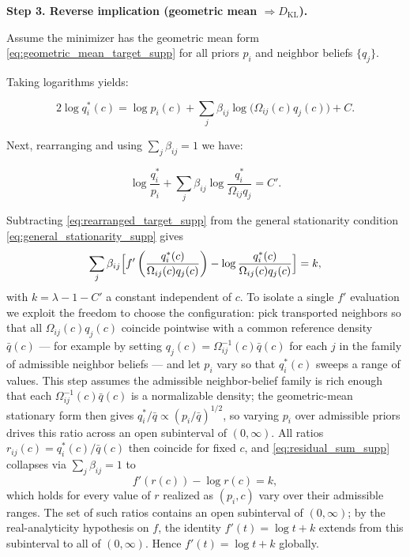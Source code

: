 \documentclass[twoside,11pt]{article}
\begin{document}
\textbf{Step 3. Reverse implication (geometric mean $\Rightarrow D_{\mathrm{KL}}$).}

Assume the minimizer has the geometric mean form \eqref{eq:geometric_mean_target_supp} for all priors $p_i$ and neighbor beliefs $\{q_j\}$.

Taking logarithms yields:

\begin{equation}
2\log q_i^*(c) = \log p_i(c) + \sum_j\beta_{ij}\log\bigl(\Omega_{ij}(c) q_j(c)\bigr) + C.
\label{eq:log_target_supp}
\end{equation}

Next, rearranging and using $\sum_j\beta_{ij}=1$ we have:

\begin{equation}
\log\frac{q_i^*}{p_i} + \sum_j\beta_{ij}\log\frac{q_i^*}{\Omega_{ij}q_j} = C'.
\label{eq:rearranged_target_supp}
\end{equation}

Subtracting \eqref{eq:rearranged_target_supp} from the general stationarity condition \eqref{eq:general_stationarity_supp} gives
\begin{equation}
\sum_{j} \beta_{ij}\Bigl[ f'\left(\frac{q_i^*(c)}{\Omega_{ij}(c)q_j(c)}\right) - \log\frac{q_i^*(c)}{\Omega_{ij}(c)q_j(c)}\Bigr] = k,
\label{eq:residual_sum_supp}
\end{equation}
with $k = \lambda - 1 - C'$ a constant independent of $c$. To isolate a single $f'$ evaluation we exploit the freedom to choose the configuration: pick transported neighbors so that all $\Omega_{ij}(c) q_j(c)$ coincide pointwise with a common reference density $\bar{q}(c)$ — for example by setting $q_j(c) = \Omega_{ij}^{-1}(c)\bar{q}(c)$ for each $j$ in the family of admissible neighbor beliefs — and let $p_i$ vary so that $q_i^*(c)$ sweeps a range of values. This step assumes the admissible neighbor-belief family is rich enough that each $\Omega_{ij}^{-1}(c)\bar{q}(c)$ is a normalizable density; the geometric-mean stationary form then gives $q_i^*/\bar{q} \propto (p_i/\bar{q})^{1/2}$, so varying $p_i$ over admissible priors drives this ratio across an open subinterval of $(0,\infty)$. All ratios $r_{ij}(c) = q_i^*(c)/\bar{q}(c)$ then coincide for fixed $c$, and \eqref{eq:residual_sum_supp} collapses via $\sum_j \beta_{ij} = 1$ to
\begin{equation}
f'(r(c)) - \log r(c) = k,
\label{eq:ode_supp}
\end{equation}
which holds for every value of $r$ realized as $(p_i,c)$ vary over their admissible ranges. The set of such ratios contains an open subinterval of $(0,\infty)$; by the real-analyticity hypothesis on $f$, the identity $f'(t) = \log t + k$ extends from this subinterval to all of $(0,\infty)$. Hence $f'(t)=\log t + k$ globally.
\end{document}
